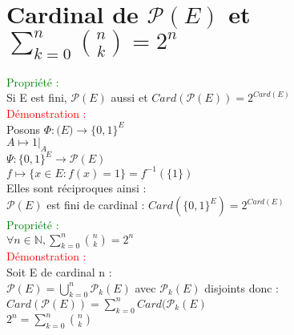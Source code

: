 \documentclass{article}
\begin{document}
\section{Cardinal de $\mathcal P (E)$ et $\sum_{k=0}^n \binom{n}{k}=2^n$ }
\textcolor{green}{Propriété :} \\
Si E est fini, $\mathcal P(E)$ aussi et $Card(\mathcal P(E))=2^{Card(E)}$ \\
\textcolor{red}{Démonstration :} \\
Posons $\Phi : \mathcal (E) \rightarrow \lbrace 0,1 \rbrace^E$ \\
$A \mapsto 1|_{A}$ \\
$\Psi : \lbrace 0,1 \rbrace^E \rightarrow \mathcal P(E)$ \\
$f \mapsto \lbrace x \in E : f(x)=1 \rbrace=f^{-1}(\lbrace 1 \rbrace)$ \\
Elles sont réciproques ainsi : \\
$ \mathcal P(E)$ est fini de cardinal : $Card(\lbrace 0,1 \rbrace^E)=2^{Card(E)} $ \\
\textcolor{green}{Propriété :} \\
$\forall n \in \mathbb N, \sum_{k=0}^n \binom{n}{k}=2^n$ \\
\textcolor{red}{Démonstration :} \\
Soit E de cardinal n : \\
$\mathcal P(E)= \bigcup_{k=0}^n \mathcal P_k(E)$ avec $\mathcal P_k(E)$ disjoints donc : \\
$Card(\mathcal P(E))=\sum_{k=0}^n Card(\mathcal P_k(E)$ \\
$2^n=\sum_{k=0}^n \binom{n}{k}$
\end{document}
